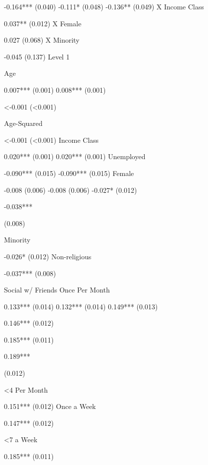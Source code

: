 -0.164***
(0.040)
-0.111*
(0.048)
-0.136**
(0.049)
X Income Class




0.037**
(0.012)
X Female




0.027
(0.068)
X Minority




-0.045
(0.137)
Level 1





Age



0.007***
(0.001)
0.008***
(0.001)


<-0.001
(<0.001)



Age-Squared



<-0.001
(<0.001)
Income Class



0.020***
(0.001)
0.020***
(0.001)
Unemployed



-0.090***
(0.015)
-0.090***
(0.015)
Female



-0.008
(0.006)
-0.008
(0.006)
-0.027*
(0.012)


-0.038***


(0.008)



Minority



-0.026*
(0.012)
Non-religious



-0.037***
(0.008)

Social w/ Friends
Once Per Month



0.133***
(0.014)
0.132***
(0.014)
0.149***
(0.013)


0.146***
(0.012)


0.185***
(0.011)


0.189***


(0.012)



<4 Per Month



0.151***
(0.012)
Once a Week



0.147***
(0.012)

<7 a Week



0.185***
(0.011)

